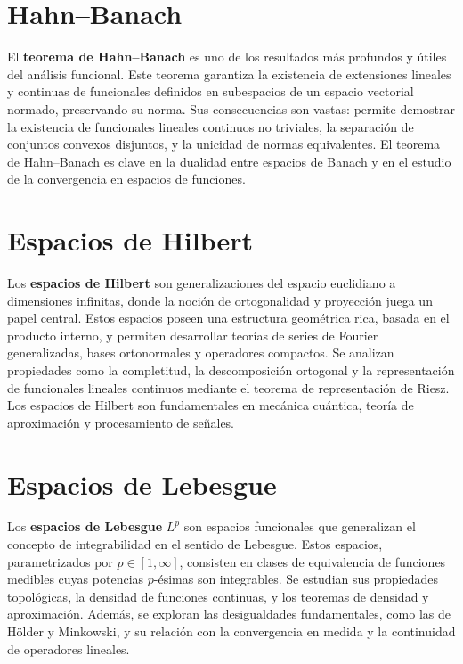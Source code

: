 \documentclass[12pt]{book}
\theoremstyle{definition}
\theoremstyle{plain}
\theoremstyle{remark}
\begin{document}
\section{Hahn--Banach}
El \textbf{teorema de Hahn--Banach} es uno de los resultados más profundos y útiles del análisis funcional. Este teorema garantiza la existencia de extensiones lineales y continuas de funcionales definidos en subespacios de un espacio vectorial normado, preservando su norma. Sus consecuencias son vastas: permite demostrar la existencia de funcionales lineales continuos no triviales, la separación de conjuntos convexos disjuntos, y la unicidad de normas equivalentes. El teorema de Hahn--Banach es clave en la dualidad entre espacios de Banach y en el estudio de la convergencia en espacios de funciones.

\section{Espacios de Hilbert}
Los \textbf{espacios de Hilbert} son generalizaciones del espacio euclidiano a dimensiones infinitas, donde la noción de ortogonalidad y proyección juega un papel central. Estos espacios poseen una estructura geométrica rica, basada en el producto interno, y permiten desarrollar teorías de series de Fourier generalizadas, bases ortonormales y operadores compactos. Se analizan propiedades como la completitud, la descomposición ortogonal y la representación de funcionales lineales continuos mediante el teorema de representación de Riesz. Los espacios de Hilbert son fundamentales en mecánica cuántica, teoría de aproximación y procesamiento de señales.

\section{Espacios de Lebesgue}
Los \textbf{espacios de Lebesgue} \( L^p \) son espacios funcionales que generalizan el concepto de integrabilidad en el sentido de Lebesgue. Estos espacios, parametrizados por \( p \in [1, \infty] \), consisten en clases de equivalencia de funciones medibles cuyas potencias \( p \)-ésimas son integrables. Se estudian sus propiedades topológicas, la densidad de funciones continuas, y los teoremas de densidad y aproximación. Además, se exploran las desigualdades fundamentales, como las de Hölder y Minkowski, y su relación con la convergencia en medida y la continuidad de operadores lineales.
\end{document}
